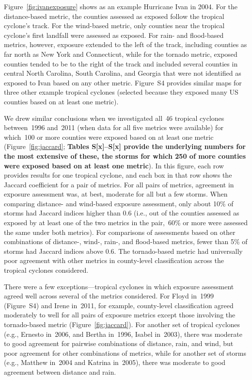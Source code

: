 Figure~\ref{fig:ivanexposure} shows as an example Hurricane Ivan in 2004.
For the distance-based metric, the counties assessed as exposed follow the
tropical cyclone's track. For the wind-based metric,
only counties near the tropical cyclone's first landfall were assessed as
exposed. For rain- and flood-based metrics, however, exposure extended to the
left of the track, including counties as far north as New York and Connecticut,
while for the tornado metric, exposed counties tended to be to the right of the
track and included several counties in central North Carolina, South Carolina,
and Georgia that were not identified as exposed to Ivan based on any other
metric. Figure~S4 provides similar maps for three other example tropical
cyclones (selected because they exposed many \ac{US}  counties based on at
least one metric).

We drew similar conclusions when we investigated all~46 tropical cyclones
between~1996 and~2011 (when data for all five metrics were available) for
which~100 or more counties were exposed based on at least one metric
(Figure~\ref{fig:jaccard}; \textbf{Tables S[x]--S[x] provide the underlying
numbers for the most extensive of these, the storms for which 250 of more
counties were exposed based on at least one metric}). In this figure, each row
provides results for one tropical cyclone, and each box in that row shows the
Jaccard coefficient for a pair of metrics. For all pairs of metrics, agreement
in exposure assessment was, at best, moderate for all but a few storms. When
comparing distance- and wind-based exposure assessment, only about 10\% of
storms had Jaccard indices higher than 0.6 (i.e., out of the counties assessed
as exposed by at least one of the two metrics in the pair,~60\si{\percent} or
more were assessed the same under both metrics). For comparisons of assessments
based on other combinations of distance-, wind-, rain-, and flood-based
metrics, fewer than 5\% of storms had Jaccard indices above 0.6.  The
tornado-based metric had universally poor agreement with other metrics in
county-level classification across the tropical cyclones considered.  

There were a few exceptions---tropical cyclones in which exposure assessment
agreed well across several of the metrics considered.  For Floyd in~1999
(Figure~S4) and Irene in~2011, for example, county-level classification agreed
moderately to well for all pairs of exposure metrics except those involving the
tornado-based metric (Figure~\ref{fig:jaccard}). For another set of tropical
cyclones (e.g., Ernesto in~2006, and Bertha in~1996, Isabel in~2003), there was
moderate to good agreement for pairwise combinations of distance, rain, and
wind, but poor agreement for other combinations of metrics, while for another
set of storms (e.g., Matthew in~2004 and Katrina in~2005), there was moderate
to good agreement between distance and rain.  



